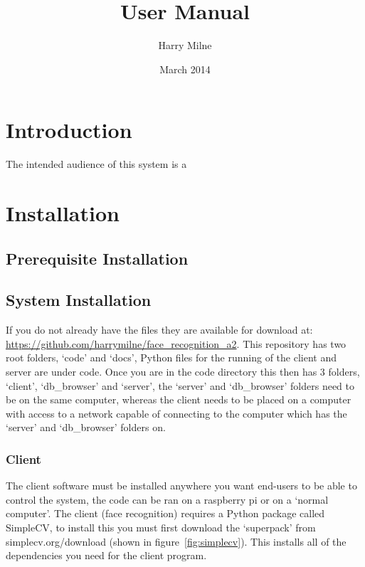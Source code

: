 \documentclass[a4paper]{article}
\title{User Manual}
\author{Harry Milne}
\date{March 2014}
\begin{document}
\maketitle
\tableofcontents
\newpage

\section{Introduction}

The intended audience of this system is a 
\section{Installation}
\subsection{Prerequisite Installation}

\subsection{System Installation}
If you do not already have the files they are available for download at: \url{https://github.com/harrymilne/face_recognition_a2}.
This repository has two root folders, `code' and `docs', Python files for the running of the client and server are under code.
Once you are in the code directory this then has 3 folders, `client', `db\_browser' and `server', the `server' and `db\_browser'
folders need to be on the same computer, whereas the client needs to be placed on a computer with access to a network capable of
connecting to the computer which has the `server' and `db\_browser' folders on. 

\subsubsection{Client}
The client software must be installed anywhere you want end-users to be able to control the system, the code can be ran on a 
raspberry pi or on a `normal computer'. 
The client (face recognition) requires a Python package called SimpleCV, to install this you must first 
download the `superpack' from simplecv.org/download (shown in figure~\ref{fig:simplecv}).  This installs all of the dependencies you need for the client program.
\end{document}
